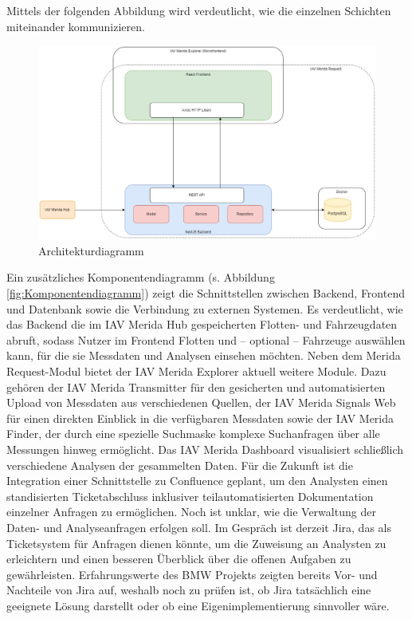 Mittels der folgenden Abbildung wird verdeutlicht, wie die einzelnen Schichten miteinander kommunizieren.
\begin{figure}[H]
    \centering
    \includegraphics[scale=.4]{media/Architekturdiagramm}
    \caption{Architekturdiagramm}
    \label{fig:Architekturdiagramm}
\end{figure}
Ein zusätzliches Komponentendiagramm (s. Abbildung \ref{fig:Komponentendiagramm}) zeigt die Schnittstellen zwischen Backend, Frontend und Datenbank sowie die Verbindung zu externen Systemen. Es verdeutlicht, wie das Backend die im IAV Merida Hub gespeicherten Flotten- und Fahrzeugdaten abruft, sodass Nutzer im Frontend Flotten und – optional – Fahrzeuge auswählen kann, für die sie Messdaten und Analysen einsehen möchten.
\newline
Neben dem Merida Request-Modul bietet der IAV Merida Explorer aktuell weitere Module. Dazu gehören der IAV Merida Transmitter für den gesicherten und automatisierten Upload von Messdaten aus verschiedenen Quellen, der IAV Merida Signals Web für einen direkten Einblick in die verfügbaren Messdaten sowie der IAV Merida Finder, der durch eine spezielle Suchmaske komplexe Suchanfragen über alle Messungen hinweg ermöglicht. Das IAV Merida Dashboard visualisiert schließlich verschiedene Analysen der gesammelten Daten.
\newline
Für die Zukunft ist die Integration einer Schnittstelle zu Confluence geplant, um den Analysten einen standisierten Ticketabschluss inklusiver teilautomatisierten Dokumentation einzelner Anfragen zu ermöglichen.
\newline
Noch ist unklar, wie die Verwaltung der Daten- und Analyseanfragen erfolgen soll. Im Gespräch ist derzeit Jira, das als Ticketsystem für Anfragen dienen könnte, um die Zuweisung an Analysten zu erleichtern und einen besseren Überblick über die offenen Aufgaben zu gewährleisten. Erfahrungswerte des BMW Projekts zeigten bereits Vor- und Nachteile von Jira auf, weshalb noch zu prüfen ist, ob Jira tatsächlich eine geeignete Lösung darstellt oder ob eine Eigenimplementierung sinnvoller wäre.
